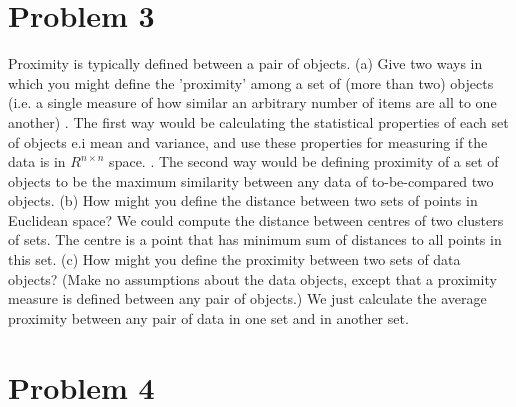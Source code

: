 \documentclass[paper=a4, fontsize=11pt]{scrartcl} %
\numberwithin{equation}{section} %
\numberwithin{figure}{section} %
\numberwithin{table}{section} %
\begin{document}
\section{Problem 3}
Proximity is typically defined between a pair of objects.
\newline
\newline
(a) Give two ways in which you might define the 'proximity' among a set of (more than two) objects (i.e. a
single measure of how similar an arbitrary number of items are all to one another)
\newline
{}. The first way would be calculating the statistical properties of each set of objects e.i mean and variance, and use these properties for measuring if the data is in $R^{n\times n}$ space.
. The second way would be defining proximity of a set of objects to be the maximum similarity between any data of to-be-compared two objects.
\newline
\newline
(b) How might you define the distance between two sets of points in Euclidean space?
\newline
\newline
We could compute the distance between centres of two clusters of sets. The centre is a point that has minimum sum of distances to all points in this set.
\newline
\newline
(c) How might you define the proximity between two sets of data objects? (Make no assumptions about the
data objects, except that a proximity measure is defined between any pair of objects.)%
\newline
\newline
We just calculate the average proximity between any pair of data in one set and in another set.

\section{Problem 4}
\end{document}
